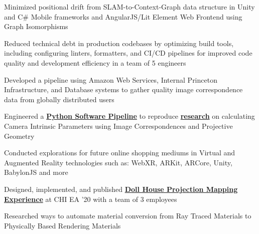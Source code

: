\documentclass[]{plushcv}
\begin{document}
\begin{minipage}[t]{0.70\textwidth}
    \begin{tightemize}
        \item Minimized positional drift from SLAM-to-Context-Graph data structure in Unity and C\# Mobile frameworks and AngularJS/Lit Element Web Frontend using Graph Isomorphisms
        \item Reduced technical debt in production codebases by optimizing build tools, including configuring linters, formatters, and CI/CD pipelines for improved code quality and development efficiency in a team of 5 engineers              
    \end{tightemize}
    \sectionsep

    \begin{tightemize}
        \sectionsep
        \item Developed a pipeline using Amazon Web Services, Internal Princeton Infrastructure, and Database systems to gather quality
        image correspondence data from globally distributed users
        \item Engineered a
        \textbf{\href{https://github.com/johanos/pollefeys-self-calibration-and-metric-reconstruction}{Python Software Pipeline}}
        to reproduce 
        \textbf{\href{https://people.inf.ethz.ch/pomarc/pubs/PollefeysIJCV99.pdf}{research}}
        on calculating Camera Intrinsic Parameters using Image Correspondences and Projective Geometry
    \end{tightemize}
    \sectionsep

    \begin{tightemize}
        \sectionsep
        \item Conducted explorations for future online shopping mediums in Virtual and Augmented Reality technologies such as: WebXR, ARKit, ARCore, Unity, BabylonJS and more
        \item Designed, implemented, and published \textbf{\href{https://dl.acm.org/doi/10.1145/3334480.3383180}{Doll House Projection Mapping Experience}} at CHI EA '20 with a team of 3 employees
        \item Researched ways to automate material conversion from Ray Traced Materials to Physically Based Rendering Materials
    \end{tightemize}
    \sectionsep


\end{minipage}
\end{document}
